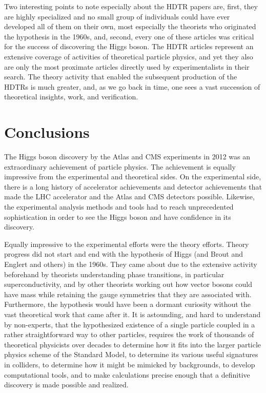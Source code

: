 \documentclass[letter,12pt]{article}
\begin{document}
Two interesting points to note especially about the HDTR papers are, first, they are highly specialized and no small group of individuals could have ever developed all of them on their own, most especially the theorists who originated the hypothesis in the 1960s, and, second, every one of these articles was critical for the success of discovering the Higgs boson. The HDTR articles represent an extensive coverage of activities of theoretical particle physics, and yet they also are only the most proximate articles directly used by experimentalists in their search. The theory activity that enabled the subsequent production of the HDTRs is much greater, and, as we go back in time, one sees a vast succession of theoretical insights, work, and verification.

\section{Conclusions}
\label{sec:conclusions}

The Higgs boson discovery by the Atlas and CMS experiments in 2012 was an extraordinary achievement of particle physics. The achievement is equally impressive from the experimental and theoretical sides. On the experimental side, there is a long history of accelerator achievements and detector achievements that made the LHC accelerator and the Atlas and CMS detectors possible. Likewise, the experimental analysis methods and tools had to reach unprecedented sophistication in order to see the Higgs boson and have confidence in its discovery.

Equally impressive to the experimental efforts were the theory efforts. Theory progress did not start and end with the hypothesis of Higgs (and Brout and Englert and others) in the 1960s. They came about due to the extensive activity beforehand by theorists understanding phase transitions, in particular superconductivity, and by other theorists working out how vector bosons could have mass while retaining the gauge symmetries that they are associated with. Furthermore, the hypothesis would have been a dormant curiosity without the vast theoretical work that came after it.  It is astounding, and hard to understand by non-experts, that the hypothesized existence of a single particle coupled in a rather straightforward way to other particles, requires the work of thousands of theoretical physicists over decades to determine how it fits into the larger particle physics scheme of the Standard Model, to determine its various useful signatures in colliders, to determine how it might be mimicked by backgrounds, to develop computational tools, and to make calculations precise enough that a definitive discovery is made possible and realized.
\end{document}
